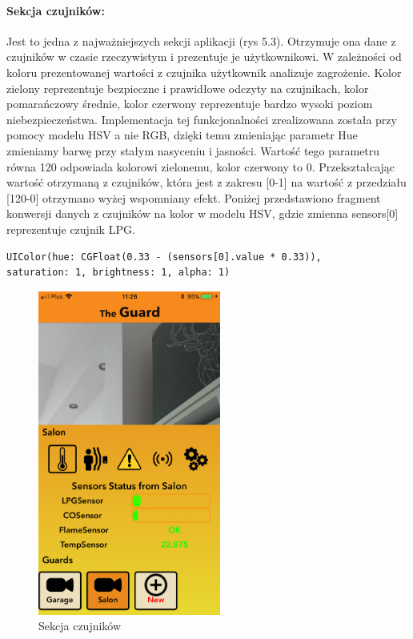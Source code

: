\paragraph{Sekcja czujników:}
Jest to jedna z najważniejszych sekcji aplikacji (rys 5.3).  Otrzymuje ona dane z czujników w czasie rzeczywistym i prezentuje je użytkownikowi.  W zależności od koloru prezentowanej wartości z czujnika użytkownik analizuje zagrożenie. Kolor zielony reprezentuje bezpieczne i prawidłowe odczyty na czujnikach, kolor pomarańczowy średnie, kolor czerwony reprezentuje bardzo wysoki poziom niebezpieczeństwa. Implementacja tej funkcjonalności zrealizowana została przy pomocy modelu HSV a nie RGB, dzięki temu zmieniając parametr Hue zmieniamy barwę przy stałym nasyceniu i jasności. Wartość tego parametru równa 120\textdegree{} odpowiada kolorowi zielonemu, kolor czerwony to 0\textdegree{}. Przekształcając wartość otrzymaną z czujników, która jest z zakresu [0-1] na wartość z przedziału [120-0] otrzymano wyżej wspomniany efekt. 
Poniżej przedstawiono fragment konwersji danych z czujników na kolor w modelu HSV, gdzie zmienna sensors[0] reprezentuje czujnik LPG.
\begin{verbatim}
UIColor(hue: CGFloat(0.33 - (sensors[0].value * 0.33)),
saturation: 1, brightness: 1, alpha: 1)
\end{verbatim}

\begin{figure}[h]
	\centering
	\includegraphics[width=6cm]{sensors.png}
	\caption{Sekcja czujników}
\end{figure}

